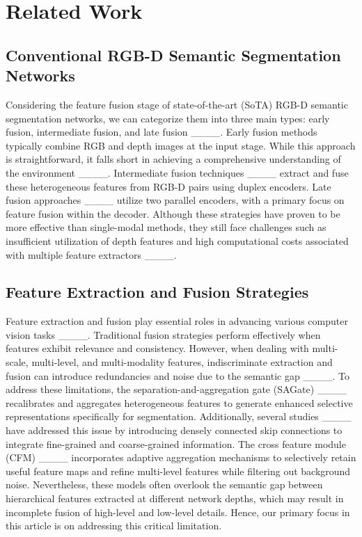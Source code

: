 \section{Related Work}
\label{sec:related_work}

\subsection{Conventional RGB-D Semantic Segmentation Networks}
\label{sec:RGB-D}
Considering the feature fusion stage of state-of-the-art (SoTA) RGB-D semantic segmentation networks, we can categorize them into three main types: early fusion, intermediate fusion, and late fusion ____. Early fusion methods typically combine RGB and depth images at the input stage. While this approach is straightforward, it falls short in achieving a comprehensive understanding of the environment ____. Intermediate fusion techniques ____ extract and fuse these heterogeneous features from RGB-D pairs using duplex encoders. Late fusion approaches ____ utilize two parallel encoders, with a primary focus on feature fusion within the decoder. Although these strategies have proven to be more effective than single-modal methods, they still face challenges such as insufficient utilization of depth features and high computational costs associated with multiple feature extractors ____. 

\subsection{Feature Extraction and Fusion Strategies}
\label{sec:feature}
Feature extraction and fusion play essential roles in advancing various computer vision tasks ____. Traditional fusion strategies perform effectively when features exhibit relevance and consistency. However, when dealing with multi-scale, multi-level, and multi-modality features, indiscriminate extraction and fusion can introduce redundancies and noise due to the semantic gap ____. To address these limitations, the separation-and-aggregation gate (SAGate) ____ recalibrates and aggregates heterogeneous features to generate enhanced selective representations specifically for segmentation. Additionally, several studies ____ have addressed this issue by introducing densely connected skip connections to integrate fine-grained and coarse-grained information. The cross feature module (CFM) ____ incorporates adaptive aggregation mechanisms to selectively retain useful feature maps and refine multi-level features while filtering out background noise. Nevertheless, these models often overlook the semantic gap between hierarchical features extracted at different network depths, which may result in incomplete fusion of high-level and low-level details. Hence, our primary focus in this article is on addressing this critical limitation.


